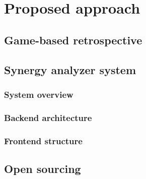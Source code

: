 \chapter{Proposed approach}
\section{Game-based retrospective}
\section{Synergy analyzer system}
\subsection{System overview}
\subsection{Backend architecture}
\subsection{Frontend structure}
\section{Open sourcing}